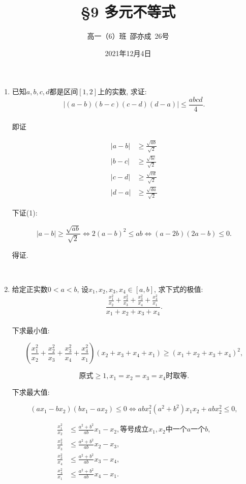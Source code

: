 \documentclass[8pt]{article}
\title{\S 9 多元不等式}
\author{高一（6）班\ 邵亦成\ 26号}
\date{2021年12月4日}
\begin{document}
	\maketitle

	\begin{enumerate}
		\item 已知$a, b, c, d$都是区间$[1, 2]$上的实数, 求证: $$|(a-b)(b-c)(c-d)(d-a)|\leq\frac{abcd}{4}.$$
			~\\

			即证

			\begin{align*}
				|a-b| &\geq \frac{\sqrt{ab}}{\sqrt{2}} \tag{1}\\
				|b-c| &\geq \frac{\sqrt{bc}}{\sqrt{2}}\\
				|c-d| &\geq \frac{\sqrt{cd}}{\sqrt{2}}\\
				|d-a| &\geq \frac{\sqrt{da}}{\sqrt{2}}
			\end{align*}

			下证(1):

			$$|a-b| \geq \frac{\sqrt{ab}}{\sqrt{2}} \Leftrightarrow 2(a-b)^2\leq ab \Leftrightarrow (a-2b)(2a-b)\leq 0.$$

			得证.

		~\\

		\item 给定正实数$0<a<b$, 设$x_1, x_2, x_3, x_4 \in [a, b]$, 求下式的极值: $$\frac{\frac{x_1^2}{x_2} + \frac{x_2^2}{x_3} + \frac{x_3^2}{x_4} + \frac{x_4^2}{x_1}}{x_1 + x_2 + x_3 + x_4}.$$
			~\\

			下求最小值:

			$$\left(\frac{x_1^2}{x_2}+\frac{x_2^2}{x_3}+\frac{x_3^2}{x_4}+\frac{x_4^2}{x_1}\right)(x_2+x_3+x_4+x_1)\geq(x_1+x_2+x_3+x_4)^2,$$

			$$\text{原式} \geq 1, x_1=x_2=x_3=x_4\text{时取等}.$$

			下求最大值:

			$$(ax_1 - bx_2)(bx_1 - ax_2) \leq 0 \Leftrightarrow abx_1^2 (a^2 + b^2)x_1 x_2 + abx_2^2 \leq 0,$$

			\begin{align*}
				\frac{x_1^2}{x_2} &\leq \frac{a^2+b^2}{ab} x_1 - x_2, \text{等号成立}x_1, x_2\text{中一个}a\text{一个}b,\\
				\frac{x_2^2}{x_3} &\leq \frac{a^2+b^2}{ab} x_2 - x_3,\\
				\frac{x_3^2}{x_4} &\leq \frac{a^2+b^2}{ab} x_3 - x_4,\\
				\frac{x_4^2}{x_1} &\leq \frac{a^2+b^2}{ab} x_4 - x_1.
			\end{align*}


\end{enumerate}
\end{document}

